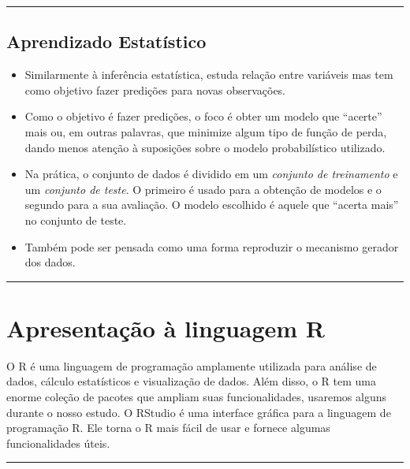 \documentclass[
]{book}
\providecommand{\tightlist}{%
  \setlength{\itemsep}{0pt}\setlength{\parskip}{0pt}}
\begin{document}
\begin{center}\rule{0.5\linewidth}{0.5pt}\end{center}

\section{Aprendizado Estatístico}\label{aprendizado-estatuxedstico}

\begin{itemize}
\tightlist
\item
  Similarmente à inferência estatística, estuda relação entre variáveis mas tem como objetivo fazer predições para novas observações.\\
\item
  Como o objetivo é fazer predições, o foco é obter um modelo que ``acerte'' mais ou, em outras palavras, que minimize algum tipo de função de perda, dando menos atenção à suposições sobre o modelo probabilístico utilizado.\\
\item
  Na prática, o conjunto de dados é dividido em um \emph{conjunto de treinamento} e um \emph{conjunto de teste}. O primeiro é usado para a obtenção de modelos e o segundo para a sua avaliação. O modelo escolhido é aquele que ``acerta mais'' no conjunto de teste.\\
\item
  Também pode ser pensada como uma forma reproduzir o mecanismo gerador dos dados.
\end{itemize}

\begin{center}\rule{0.5\linewidth}{0.5pt}\end{center}

\chapter{Apresentação à linguagem R}\label{apresentacao_r}

O R é uma linguagem de programação amplamente utilizada para análise de dados, cálculo estatísticos e visualização de dados. Além disso, o R tem uma enorme coleção de pacotes que ampliam suas funcionalidades, usaremos alguns durante o nosso estudo.
O RStudio é uma interface gráfica para a linguagem de programação R. Ele torna o R mais fácil de usar e fornece algumas funcionalidades úteis.

\begin{center}\rule{0.5\linewidth}{0.5pt}\end{center}
\end{document}
